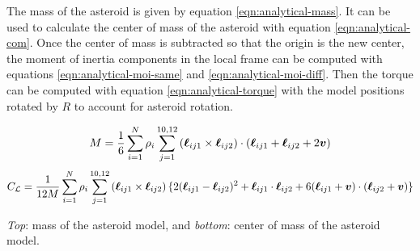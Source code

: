 \documentclass[aps,twocolumn,secnumarabic,balancelastpage,amsmath,amssymb,nofootinbib,floatfix]{revtex4-1}
\begin{document}
The mass of the asteroid is given by equation \ref{eqn:analytical-mass}. It can be used to calculate the center of mass of the asteroid with equation \ref{eqn:analytical-com}. Once the center of mass is subtracted so that the origin is the new center, the moment of inertia components in the local frame can be computed with equations \ref{eqn:analytical-moi-same} and  \ref{eqn:analytical-moi-diff}. Then the torque can be computed with equation \ref{eqn:analytical-torque} with the model positions rotated by $R$ to account for asteroid rotation.

\begin{table*} 
    \begin{equation}
        M = \frac{1}{6}\sum_{i=1}^N\rho_i \sum_{j=1}^{10, 12} \left( \bm\ell_{ij1} \times \bm\ell_{ij2} \right) \cdot (\bm \ell_{ij1} + \bm \ell_{ij2} + 2\bm v)
        \label{eqn:analytical-mass}
    \end{equation}
    \begin{equation}
        C_\mathcal{L} = \frac{1}{12M}\sum_{i=1}^N\rho_i \sum_{j=1}^{10, 12} \left( \bm\ell_{ij1} \times \bm\ell_{ij2} \right) \{2(\bm \ell_{ij1} - \bm \ell_{ij2})^2 + \bm \ell_{ij1}\cdot  \bm \ell_{ij2} + 6(\bm \ell_{ij1}+ \bm v)\cdot (\bm \ell_{ij2} + \bm v)\}
        \label{eqn:analytical-com}
    \end{equation}
    \caption*{\textit{Top}: mass of the asteroid model, and \textit{bottom}: center of mass of the asteroid model. }
\end{table*}
\end{document}
